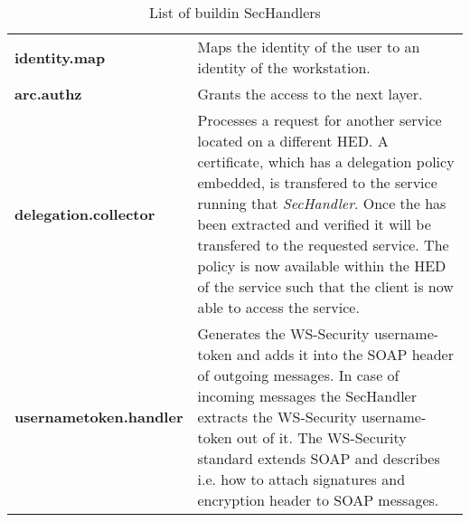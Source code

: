   \begin{table}[htb]
  \centering
  \caption{List of buildin SecHandlers}
  \label{tbl:list_of_sechandler}
  \begin{tabular*}{\textwidth}[t]{p{4cm}p{11cm}}
	\hline
 	\textbf{identity.map}         & Maps the identity of the user to an identity of the workstation.\\
 	\textbf{arc.authz}            & Grants the access to the next layer.\\
 	\textbf{delegation.collector} & Processes a request for another service located on a different HED.
                                        A certificate, which has a delegation policy embedded, is transfered to the service running that \textit{SecHandler}. Once the has been extracted and verified it will be transfered
                                        to the requested service.
                                        The policy is now available within the HED of the service such that the client is now able to access the service.\\
 	\textbf{usernametoken.handler}& Generates the WS-Security username-token and adds it into the SOAP header of outgoing
					 messages. In case of incoming messages the SecHandler extracts the WS-Security username-token out of it. The WS-Security standard extends SOAP and describes i.e. how to attach signatures and encryption header to SOAP messages.\\
	\hline
  \end{tabular*}
  \end{table}
%
